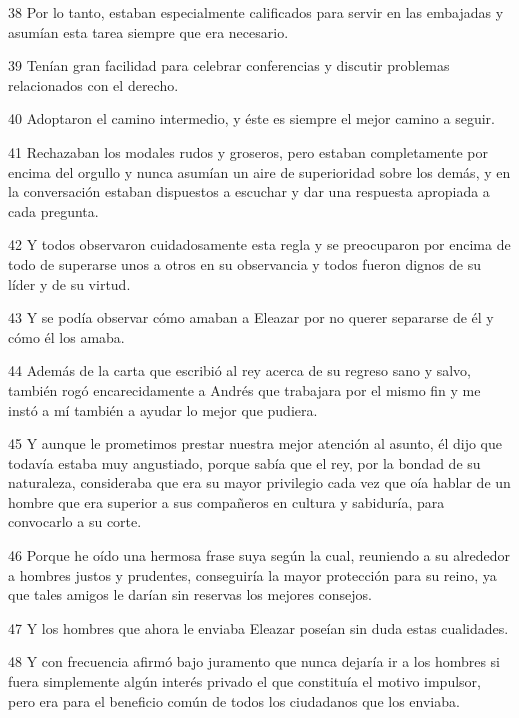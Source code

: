 \par 38 Por lo tanto, estaban especialmente calificados para servir en las embajadas y asumían esta tarea siempre que era necesario.

\par 39 Tenían gran facilidad para celebrar conferencias y discutir problemas relacionados con el derecho.

\par 40 Adoptaron el camino intermedio, y éste es siempre el mejor camino a seguir.

\par 41 Rechazaban los modales rudos y groseros, pero estaban completamente por encima del orgullo y nunca asumían un aire de superioridad sobre los demás, y en la conversación estaban dispuestos a escuchar y dar una respuesta apropiada a cada pregunta.

\par 42 Y todos observaron cuidadosamente esta regla y se preocuparon por encima de todo de superarse unos a otros en su observancia y todos fueron dignos de su líder y de su virtud.

\par 43 Y se podía observar cómo amaban a Eleazar por no querer separarse de él y cómo él los amaba.

\par 44 Además de la carta que escribió al rey acerca de su regreso sano y salvo, también rogó encarecidamente a Andrés que trabajara por el mismo fin y me instó a mí también a ayudar lo mejor que pudiera.

\par 45 Y aunque le prometimos prestar nuestra mejor atención al asunto, él dijo que todavía estaba muy angustiado, porque sabía que el rey, por la bondad de su naturaleza, consideraba que era su mayor privilegio cada vez que oía hablar de un hombre que era superior a sus compañeros en cultura y sabiduría, para convocarlo a su corte.

\par 46 Porque he oído una hermosa frase suya según la cual, reuniendo a su alrededor a hombres justos y prudentes, conseguiría la mayor protección para su reino, ya que tales amigos le darían sin reservas los mejores consejos.

\par 47 Y los hombres que ahora le enviaba Eleazar poseían sin duda estas cualidades.

\par 48 Y con frecuencia afirmó bajo juramento que nunca dejaría ir a los hombres si fuera simplemente algún interés privado el que constituía el motivo impulsor, pero era para el beneficio común de todos los ciudadanos que los enviaba.

